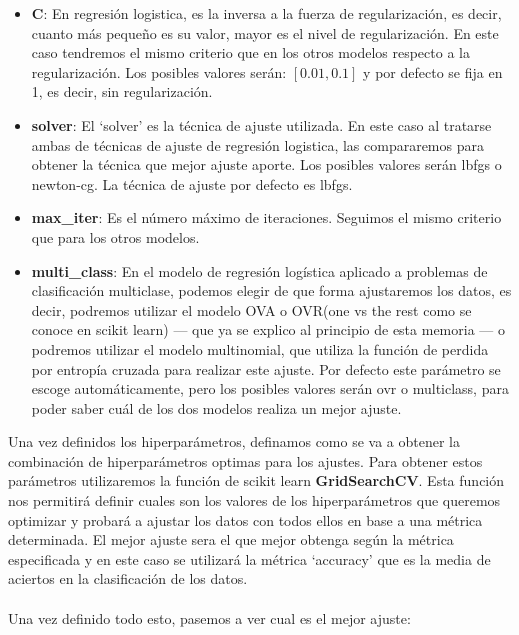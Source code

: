 \begin{itemize}
   \begin{itemize}
      \item \textbf{C}: En regresión logistica, es la inversa a la fuerza de regularización, es decir, cuanto más pequeño es su valor, mayor es el nivel de regularización. En este caso tendremos el mismo criterio que en los otros modelos respecto a la regularización. Los posibles valores serán: $[0.01, 0.1]$ y por defecto se fija en 1, es decir, sin regularización.
      \item \textbf{solver}: El `solver' es la técnica de ajuste utilizada. En este caso al tratarse ambas de técnicas de ajuste de regresión logistica, las compararemos para obtener la técnica que mejor ajuste aporte. Los posibles valores serán lbfgs o newton-cg. La técnica de ajuste por defecto es lbfgs.
      \item \textbf{max\_iter}: Es el número máximo de iteraciones. Seguimos el mismo criterio que para los otros modelos.
      \item \textbf{multi\_class}: En el modelo de regresión logística aplicado a problemas de clasificación multiclase, podemos elegir de que forma ajustaremos los datos, es decir, podremos utilizar el modelo OVA o OVR(one vs the rest como se conoce en scikit learn) --- que ya se explico al principio de esta memoria --- o podremos utilizar el modelo multinomial, que utiliza la función de perdida por entropía cruzada para realizar este ajuste. Por defecto este parámetro se escoge automáticamente, pero los posibles valores serán ovr o multiclass, para poder saber cuál de los dos modelos realiza un mejor ajuste.
   \end{itemize}
\end{itemize}

Una vez definidos los hiperparámetros, definamos como se va a obtener la combinación de hiperparámetros optimas para los ajustes. Para obtener estos parámetros utilizaremos la función de scikit learn \textbf{GridSearchCV}\cite{GridSearchCV}. Esta función nos permitirá definir cuales son los valores de los hiperparámetros que queremos optimizar y probará a ajustar los datos con todos ellos en base a una métrica determinada. El mejor ajuste sera el que mejor obtenga según la métrica especificada y en este caso se utilizará la métrica `accuracy'\cite{Accuracy} que es la media de aciertos en la clasificación de los datos.
\\\\
Una vez definido todo esto, pasemos a ver cual es el mejor ajuste:

